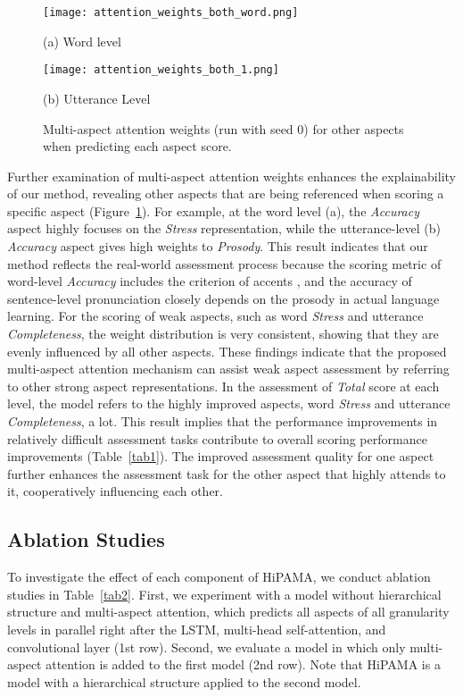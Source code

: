 \documentclass{article}
\begin{document}
\begin{figure}[t]
\begin{minipage}[b]{1.0\linewidth}
  \centering
  \centerline{\texttt{[image: attention\_weights\_both\_word.png]}}
\centerline{(a) Word level}\smallskip
\end{minipage}
\begin{minipage}[b]{1.0\linewidth}
  \centering
  \centerline{\texttt{[image: attention\_weights\_both\_1.png]}}
\centerline{(b) Utterance Level}
\end{minipage}
\caption{Multi-aspect attention weights (run with seed 0) for other aspects when predicting each aspect score.}
\label{fig:attn}
\end{figure}

Further examination of multi-aspect attention weights enhances the explainability of our method, revealing other aspects that are being referenced when scoring a specific aspect (Figure~\ref{fig:attn}). For example, at the word level (a), the \textit{Accuracy} aspect highly focuses on the \textit{Stress} representation, while the utterance-level (b) \textit{Accuracy} aspect gives high weights to \textit{Prosody}. This result indicates that our method reflects the real-world assessment process because the scoring metric of word-level \textit{Accuracy} includes the criterion of accents \cite{zhang2021speechocean762}, and the accuracy of sentence-level pronunciation closely depends on the prosody \cite{sonia2016importance} in actual language learning. For the scoring of weak aspects, such as word \textit{Stress} and utterance \textit{Completeness}, the weight distribution is very consistent, showing that they are evenly influenced by all other aspects. These findings indicate that the proposed multi-aspect attention mechanism can assist weak aspect assessment by referring to other strong aspect representations. In the assessment of \textit{Total} score at each level, the model refers to the highly improved aspects, word \textit{Stress} and utterance \textit{Completeness}, a lot. This result implies that the performance improvements in relatively difficult assessment tasks contribute to overall scoring performance improvements (Table~\ref{tab1}). The improved assessment quality for one aspect further enhances the assessment task for the other aspect that highly attends to it, cooperatively influencing each other.

\subsection{Ablation Studies}
To investigate the effect of each component of HiPAMA, we conduct ablation studies in Table~\ref{tab2}. First, we experiment with a model without hierarchical structure and multi-aspect attention, which predicts all aspects of all granularity levels in parallel right after the LSTM, multi-head self-attention, and convolutional layer (1st row). Second, we evaluate a model in which only multi-aspect attention is added to the first model (2nd row). Note that HiPAMA is a model with a hierarchical structure applied to the second model. 
\end{document}

